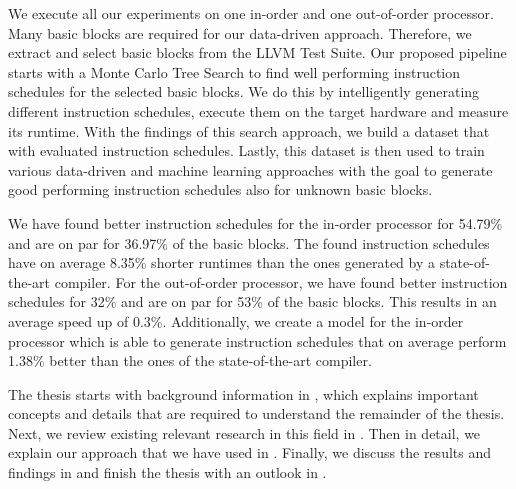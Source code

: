 
We execute all our experiments on one in-order and one out-of-order processor.
Many basic blocks are required for our data-driven approach.
Therefore, we extract and select basic blocks from the LLVM Test Suite.
Our proposed pipeline starts with a Monte Carlo Tree Search to find well performing instruction schedules for the selected basic blocks.
We do this by intelligently generating different instruction schedules, execute them on the target hardware and measure its runtime.
With the findings of this search approach, we build a dataset that with evaluated instruction schedules.
Lastly, this dataset is then used to train various data-driven and machine learning approaches with the goal to generate good performing instruction schedules also for unknown basic blocks.

We have found better instruction schedules for the in-order processor for 54.79\% and are on par for 36.97\% of the basic blocks.
The found instruction schedules have on average 8.35\% shorter runtimes than the ones generated by a state-of-the-art compiler.
For the out-of-order processor, we have found better instruction schedules for 32\% and are on par for 53\% of the basic blocks.
This results in an average speed up of 0.3\%.
Additionally, we create a model for the in-order processor which is able to generate instruction schedules that on average perform 1.38\% better than the ones of the state-of-the-art compiler.

The thesis starts with background information in , which explains important concepts and details that are required to understand the remainder of the thesis.
Next, we review existing relevant research in this field in .
Then in detail, we explain our approach that we have used in .
Finally, we discuss the results and findings in  and finish the thesis with an outlook in .








